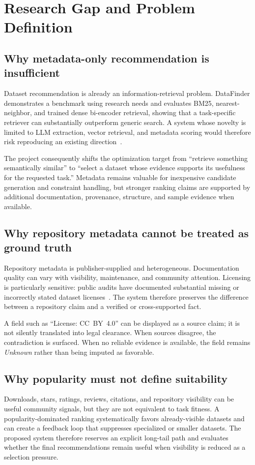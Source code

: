 \documentclass[11pt]{article}
\begin{document}
\section{Research Gap and Problem Definition}

\subsection{Why metadata-only recommendation is insufficient}
Dataset recommendation is already an information-retrieval problem. DataFinder demonstrates a benchmark
using research needs and evaluates BM25, nearest-neighbor, and trained dense bi-encoder retrieval, showing
that a task-specific retriever can substantially outperform generic search. A system whose novelty is
limited to LLM extraction, vector retrieval, and metadata scoring would therefore risk reproducing an
existing direction~\cite{datafinder}.

The project consequently shifts the optimization target from ``retrieve something semantically similar'' to
``select a dataset whose evidence supports its usefulness for the requested task.'' Metadata remains
valuable for inexpensive candidate generation and constraint handling, but stronger ranking claims are
supported by additional documentation, provenance, structure, and sample evidence when available.

\subsection{Why repository metadata cannot be treated as ground truth}
Repository metadata is publisher-supplied and heterogeneous. Documentation quality can vary with
visibility, maintenance, and community attention. Licensing is particularly sensitive: public audits have
documented substantial missing or incorrectly stated dataset licenses~\cite{licensing-audit}. The system
therefore preserves the difference between a repository claim and a verified or cross-supported fact.

A field such as ``License: CC~BY~4.0'' can be displayed as a source claim; it is not silently translated
into legal clearance. When sources disagree, the contradiction is surfaced. When no reliable evidence is
available, the field remains \emph{Unknown} rather than being imputed as favorable.

\subsection{Why popularity must not define suitability}
Downloads, stars, ratings, reviews, citations, and repository visibility can be useful community signals,
but they are not equivalent to task fitness. A popularity-dominated ranking systematically favors
already-visible datasets and can create a feedback loop that suppresses specialized or smaller datasets.
The proposed system therefore reserves an explicit long-tail path and evaluates whether the final
recommendations remain useful when visibility is reduced as a selection pressure.
\end{document}
